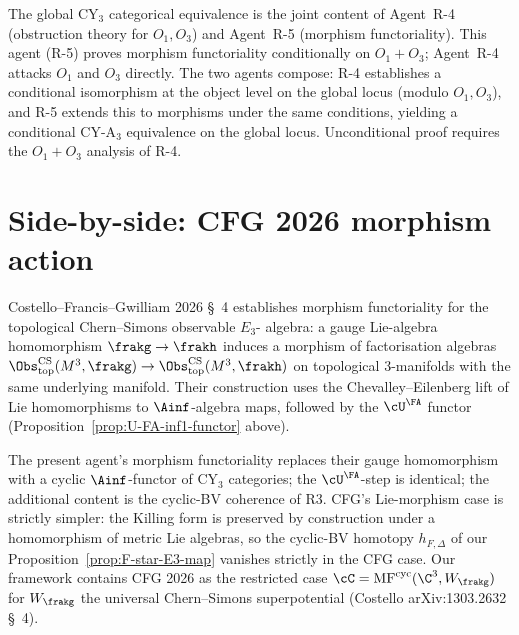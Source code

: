 \begin{remark}
\label{rem:global-scope-R4-R5}
The global CY$_3$ categorical equivalence is the joint content of
Agent~R-4 (obstruction theory for $O_1, O_3$) and Agent~R-5 (morphism
functoriality).  This agent (R-5) proves morphism functoriality
conditionally on $O_1 + O_3$; Agent~R-4 attacks $O_1$ and $O_3$
directly.  The two agents compose: R-4 establishes a conditional
isomorphism at the object level on the global locus (modulo $O_1, O_3$),
and R-5 extends this to morphisms under the same conditions, yielding a
conditional CY-A$_3$ equivalence on the global locus.  Unconditional
proof requires the $O_1 + O_3$ analysis of R-4.
\end{remark}

\section*{Side-by-side: CFG 2026 morphism action}

\begin{remark}
\label{rem:cfg-2026-morphism-analogue}
Costello--Francis--Gwilliam 2026 \S~4 establishes morphism
functoriality for the topological Chern--Simons observable $E_3$-
algebra: a gauge Lie-algebra homomorphism $\frakg \to \frakh$ induces
a morphism of factorisation algebras
$\Obs^{\mathrm{CS}}_{\mathrm{top}}(M^3, \frakg) \to
\Obs^{\mathrm{CS}}_{\mathrm{top}}(M^3, \frakh)$ on topological
$3$-manifolds with the same underlying manifold.  Their construction
uses the Chevalley--Eilenberg lift of Lie homomorphisms to
$\Ainf$-algebra maps, followed by the $\cU^\FA$ functor
(Proposition~\ref{prop:U-FA-inf1-functor} above).

The present agent's morphism functoriality replaces their gauge
homomorphism with a cyclic $\Ainf$-functor of CY$_3$ categories; the
$\cU^\FA$-step is identical; the additional content is the cyclic-BV
coherence of R3.  CFG's Lie-morphism case is strictly simpler: the
Killing form is preserved by construction under a homomorphism of
metric Lie algebras, so the cyclic-BV homotopy $h_{F,\Delta}$ of our
Proposition~\ref{prop:F-star-E3-map} vanishes strictly in the CFG case.
Our framework contains CFG 2026 as the restricted case
$\cC = \mathrm{MF}^{\mathrm{cyc}}(\C^3, W_\frakg)$ for
$W_\frakg$ the universal Chern--Simons superpotential (Costello
arXiv:1303.2632 \S~4).
\end{remark}

